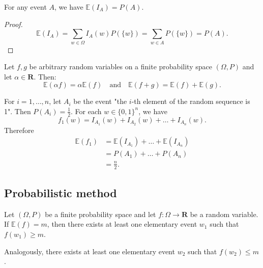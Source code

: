 \begin{lemma}
For any event $A$, we have $\mathbb{E}(I_{A})=P(A)$.
\end{lemma}
\begin{proof}
$$
\mathbb{E}(I_{A})=\sum _{w\in \Omega}I_{A}(w)P(\{ w\})=\sum _{w\in A}P(\{ w \})=P(A).
$$
\end{proof}
\begin{theorem}
Let $f,g$ be arbitrary random variables on a finite probability space $(\Omega,P)$ and let $\alpha \in \mathbf{R}$. Then:
$$
\mathbb{E}(\alpha f)=\alpha \mathbb{E}(f)\quad\text{and}\quad \mathbb{E}(f+g)=\mathbb{E}(f)+\mathbb{E}(g).
$$
\end{theorem}
\begin{example}
For $i=1,\dots,n$, let $A_{i}$ be the event "the $i$-th element of the random sequence is 1". Then $P(A_{i})=\frac{1}{2}$. For each $w\in \{ 0,1 \}^{n}$, we have
$$
f_{1}(w)=I_{A_{1}}(w)+I_{A_{2}}(w)+\dots +I_{A_{n}}(w).
$$
Therefore
\begin{align*}
\mathbb{E}(f_{1}) & =\mathbb{E}(I_{A_{1}})+\dots +\mathbb{E}(I_{A_{n}}) \\
 & =P(A_{1})+\dots +P(A_{n}) \\
 & =\frac{n}{2}.
\end{align*}
\end{example}
\subsection{Probabilistic method}
\begin{theorem}\label{thm111}
Let $(\Omega,P)$ be a finite probability space and let $f:\Omega \to \mathbf{R}$ be a random variable. If $\mathbb{E}(f)=m$, then there exists at least one elementary event $w_{1}$ such that $f(w_{1})\ge m$. 

Analogously, there exists at least one elementary event $w_{2}$ such that $f(w_{2})\le m$.
\end{theorem}
